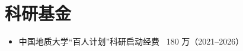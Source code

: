 \section*{科研基金}

\begin{itemize}
\item 中国地质大学“百人计划”科研启动经费 \textyen\ 180 万（2021--2026）
\end{itemize}
